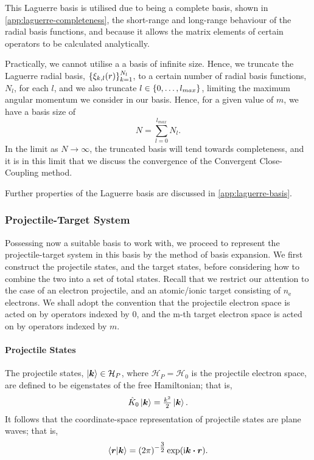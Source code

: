 \documentclass[draft]{article}
\begin{document}
This Laguerre basis is utilised due to being a complete basis, shown in
\autoref{app:laguerre-completeness}, the short-range and long-range behaviour of
the radial basis functions, and because it allows the matrix elements of certain
operators to be calculated analytically.

Practically, we cannot utilise a a basis of infinite size.
Hence, we truncate the Laguerre radial basis,
$\lbrace\xi_{k, l}(r)\rbrace_{k = 1}^{N_{l}}$, to a certain number of radial basis
functions, $N_{l}$, for each $l$, and we also truncate
$l \in \lbrace0, \dotsc, l_{max}\rbrace$,
limiting the maximum angular momentum we consider in our basis.
Hence, for a given value of $m$, we have a basis size of
\begin{equation}
  \label{eq:basis-size}
  N
  =
  \sum_{l = 0}^{l_{max}}
  N_{l}
  .
\end{equation}
In the limit as $N \to \infty$, the truncated basis will tend towards
completeness, and it is in this limit that we discuss the convergence of the
Convergent Close-Coupling method.

Further properties of the Laguerre basis are discussed in
\autoref{app:laguerre-basis}.

\subsubsection{Projectile-Target System}
\label{sec:projectile-target}

Possessing now a suitable basis to work with, we proceed to represent the
projectile-target system in this basis by the method of basis expansion.
We first construct the projectile states, and the target states, before
considering how to combine the two into a set of total states.
Recall that we restrict our attention to the case of an electron projectile, and
an atomic/ionic target consisting of $n_{\mathrm{e}}$ electrons.
We shall adopt the convention that the projectile electron space is acted on by
operators indexed by $0$, and the m-th target electron space is acted on by
operators indexed by $m$.

\paragraph{Projectile States}
\label{sec:projectile-states}

The projectile states, $\ket{\boldsymbol{k}} \in \mathcal{H}_{P}$, where
$\mathcal{H}_{P} = \mathcal{H}_{0}$ is the projectile electron space, are
defined to be eigenstates of the free Hamiltonian; that is,
\begin{equation}
  \label{eq:projectile-hamiltonian}
  \hat{K}_{0}
  \ket{\boldsymbol{k}}
  =
  \tfrac{k^{2}}{2}
  \ket{\boldsymbol{k}}
  .
\end{equation}
It follows that the coordinate-space representation of projectile states are
plane waves; that is,
\begin{equation}
  \label{eq:projectile-states}
  \bra{\boldsymbol{r}}
  \ket{\boldsymbol{k}}
  =
  \lr{2 \pi}^{-\tfrac{3}{2}}
  \exponential\lr
  {
    \imath
    \boldsymbol{k}
    \vdot
    \boldsymbol{r}
  }
  .
\end{equation}
\end{document}

